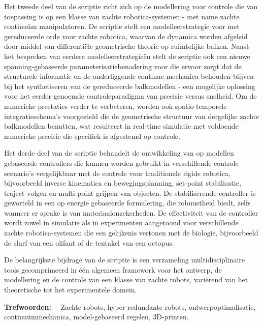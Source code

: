 Het tweede deel van de scriptie richt zich op de modellering voor controle die van toepassing is op een klasse van zachte robotica-systemen - met name zachte continuüm manipulatoren. De scriptie stelt een modelleerstrategie voor met gereduceerde orde voor zachte robotica, waarvan de dynamica worden afgeleid door middel van differentiële geometrische theorie op ruimtelijke balken. Naast het bespreken van eerdere modelleerstrategieën stelt de scriptie ook een nieuwe spanning-gebaseerde parameterisatiebenadering voor die ervoor zorgt dat de structurele informatie en de onderliggende continue mechanica behouden blijven bij het synthetiseren van de gereduceerde balkmodellen - een mogelijke oplossing voor het eerder genoemde controleparadigma van precisie versus snelheid. Om de numerieke prestaties verder te verbeteren, worden ook spatio-temporele integratieschema's voorgesteld die de geometrische structuur van dergelijke zachte balkmodellen benutten, wat resulteert in real-time simulatie met voldoende numerieke precisie die specifiek is afgestemd op controle.

Het derde deel van de scriptie behandelt de ontwikkeling van op modellen gebaseerde controllers die kunnen worden gebruikt in verschillende controle scenario's vergelijkbaar met de controle voor traditionele rigide robotica, bijvoorbeeld inverse kinematica en bewegingsplanning, set-point stabilisatie, traject volgen en multi-point grijpen van objecten. De stabiliserende controller is geworteld in een op energie gebaseerde formulering, die robuustheid biedt, zelfs wanneer er sprake is van materiaalonzekerheden. De effectiviteit van de controller wordt zowel in simulatie als in experimenten aangetoond voor verschillende zachte robotica-systemen die een gelijkenis vertonen met de biologie, bijvoorbeeld de slurf van een olifant of de tentakel van een octopus.

De belangrijkste bijdrage van de scriptie is een verzameling multidisciplinaire tools gecomprimeerd in één algemeen framework voor het ontwerp, de modellering en de controle van een klasse van zachte robots, variërend van het theoretische tot het experimentele domein.

\vspace*{11pt}\noindent
\textbf{Trefwoorden:} \ \ Zachte robots, hyper-redundante robots, ontwerpoptimalisatie, continuümmechanica, model-gebaseerd regelen, 3D-printen.

